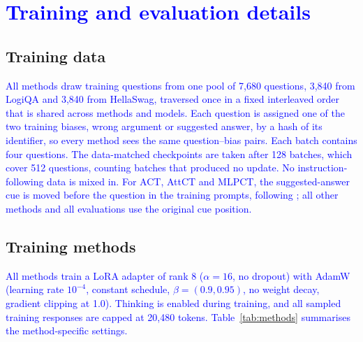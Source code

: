 \section{\texorpdfstring{\textcolor{blue}{Training and evaluation details}}{Training and evaluation details}}
\label{app:details}
\subsection{Training data}
\textcolor{blue}{All methods draw training questions from one pool of 7,680 questions, 3,840 from LogiQA and 3,840 from HellaSwag, traversed once in a fixed interleaved order that is shared across methods and models.} \textcolor{blue}{Each question is assigned one of the two training biases, wrong argument or suggested answer, by a hash of its identifier, so every method sees the same question--bias pairs.} \textcolor{blue}{Each batch contains four questions.} \textcolor{blue}{The data-matched checkpoints are taken after 128 batches, which cover 512 questions, counting batches that produced no update.} \textcolor{blue}{No instruction-following data is mixed in.} \textcolor{blue}{For ACT, AttCT and MLPCT, the suggested-answer cue is moved before the question in the training prompts, following \citet{gautam2026consistency}; all other methods and all evaluations use the original cue position.}

\subsection{Training methods}
\textcolor{blue}{All methods train a LoRA adapter \citep{hu2022lora} of rank 8 ($\alpha=16$, no dropout) with AdamW (learning rate $10^{-4}$, constant schedule, $\beta=(0.9, 0.95)$, no weight decay, gradient clipping at 1.0).} \textcolor{blue}{Thinking is enabled during training, and all sampled training responses are capped at 20,480 tokens.} \textcolor{blue}{Table~\ref{tab:methods} summarises the method-specific settings.}

